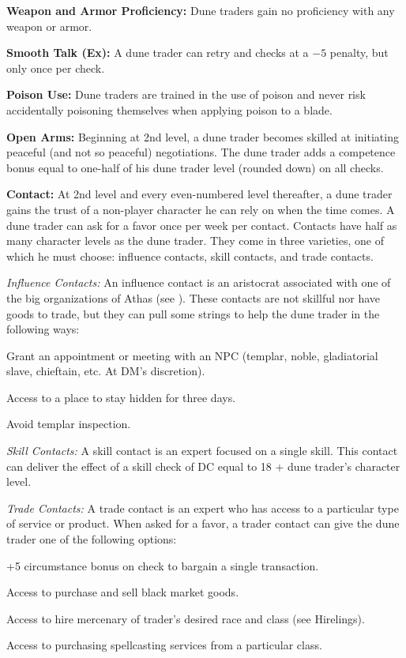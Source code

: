{
\textbf{Weapon and Armor Proficiency:} Dune traders gain no proficiency with any weapon or armor.

\textbf{Smooth Talk (Ex):} A dune trader can retry  and  checks at a $-5$ penalty, but only once per check.

\textbf{Poison Use:} Dune traders are trained in the use of poison and never risk accidentally poisoning themselves when applying poison to a blade.

\textbf{Open Arms:} Beginning at 2nd level, a dune trader becomes skilled at initiating peaceful (and not so peaceful) negotiations. The dune trader adds a competence bonus equal to one-half of his dune trader level (rounded down) on all  checks.

\textbf{Contact:} At 2nd level and every even-numbered level thereafter, a dune trader gains the trust of a non-player character he can rely on when the time comes. A dune trader can ask for a favor once per week per contact. Contacts have half as many character levels as the dune trader. They come in three varieties, one of which he must choose: influence contacts, skill contacts, and trade contacts.

\textit{Influence Contacts:} An influence contact is an aristocrat associated with one of the big organizations of Athas (see ). These contacts are not skillful nor have goods to trade, but they can pull some strings to help the dune trader in the following ways: 

\begin{itemize*}
\item Grant an appointment or meeting with an NPC (templar, noble, gladiatorial slave, chieftain, etc. At DM's discretion).
\item Access to a place to stay hidden for three days.
\item Avoid templar inspection.
\end{itemize*}

\textit{Skill Contacts:} A skill contact is an expert focused on a single skill. This contact can deliver the effect of a skill check of DC equal to 18 + \onehalf dune trader's character level.

\textit{Trade Contacts:} A trade contact is an expert who has access to a particular type of service or product. When asked for a favor, a trader contact can give the dune trader one of the following options:

\begin{itemize*}
\item +5 circumstance bonus on  check to bargain a single transaction.
\item Access to purchase and sell black market goods.
\item Access to hire mercenary of trader's desired race and class (see Hirelings).
\item Access to purchasing spellcasting services from a particular class.
\end{itemize*}

}
